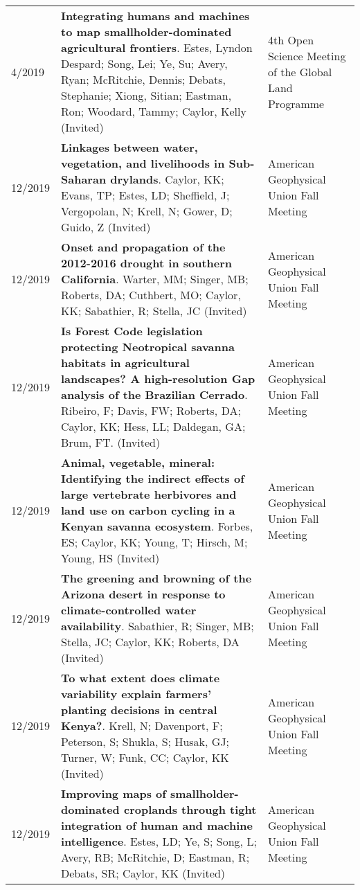 \begin{longtable}{lp{10.0cm}p{4.5cm}}
4/2019 & {\bf Integrating humans and machines to map smallholder-dominated agricultural frontiers}. Estes, Lyndon Despard; Song, Lei; Ye, Su; Avery, Ryan; McRitchie, Dennis; Debats, Stephanie; Xiong, Sitian; Eastman, Ron; Woodard, Tammy; Caylor, Kelly  (Invited)  & 4th Open Science Meeting of the Global Land Programme \\
  
12/2019 & {\bf Linkages between water, vegetation, and livelihoods in Sub-Saharan drylands}. Caylor, KK; Evans, TP; Estes, LD; Sheffield, J; Vergopolan, N; Krell, N;  Gower, D; Guido, Z  (Invited)  & American Geophysical Union Fall Meeting \\
  
12/2019 & {\bf Onset and propagation of the 2012-2016 drought in southern California}. Warter, MM; Singer, MB; Roberts, DA; Cuthbert, MO; Caylor, KK; Sabathier, R; Stella, JC  (Invited)  & American Geophysical Union Fall Meeting \\
  
12/2019 & {\bf Is Forest Code legislation protecting Neotropical savanna habitats in agricultural landscapes? A high-resolution Gap analysis of the Brazilian Cerrado}. Ribeiro, F; Davis, FW; Roberts, DA; Caylor, KK; Hess, LL; Daldegan, GA; Brum, FT.   (Invited)  & American Geophysical Union Fall Meeting \\
  
12/2019 & {\bf Animal, vegetable, mineral: Identifying the indirect effects of large vertebrate herbivores and land use on carbon cycling in a Kenyan savanna ecosystem}. Forbes, ES; Caylor, KK; Young, T; Hirsch, M; Young, HS  (Invited)  & American Geophysical Union Fall Meeting \\
  
12/2019 & {\bf The greening and browning of the Arizona desert in response to climate-controlled water availability}. Sabathier, R; Singer, MB; Stella, JC; Caylor, KK; Roberts, DA  (Invited)  & American Geophysical Union Fall Meeting \\
  
12/2019 & {\bf To what extent does climate variability explain farmers' planting decisions in central Kenya?}. Krell, N; Davenport, F; Peterson, S; Shukla, S; Husak, GJ; Turner, W; Funk, CC; Caylor, KK  (Invited)  & American Geophysical Union Fall Meeting \\
  
12/2019 & {\bf Improving maps of smallholder-dominated croplands through tight integration of human and machine intelligence}. Estes, LD; Ye, S; Song, L; Avery, RB; McRitchie, D; Eastman, R; Debats, SR; Caylor, KK  (Invited)  & American Geophysical Union Fall Meeting \\
  

\end{longtable}
